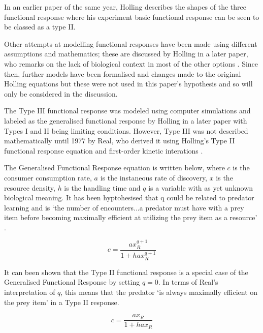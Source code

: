 \documentclass[11pt, a4paper, titlepage]{article}
\begin{document}
In an earlier paper of the same year, Holling describes the shapes of the three functional response \parencite{Holling1959a} where his experiment basic functional response can be seen to be classed as a type II.

Other attempts at modelling functional responses have been made using different assumptions and mathematics; these are discussed by Holling in a later paper, who remarks on the lack of biological context in most of the other options \parencite{Holling1965}. Since then, further models have been formalised and changes made to the original Holling equations but these were not used in this paper's hypothesis and so will only be considered in the discussion. 

\bigskip

The Type III functional response was modeled using computer simulations and labeled as the generalised functional response by Holling in a later paper \parencite{Holling1965} with Types I and II being limiting conditions. However, Type III was not described mathematically until 1977 by Real, who derived it using Holling's Type II functional response equation and first-order kinetic interations \parencite{Real1977}.
 
The Generalised Functional Response equation is written below, where $c$ is the consumer consumption rate, $a$ is the instaneous rate of discovery, $x$ is the resource density, $h$ is the handling time and $q$ is a variable with as yet unknown biological meaning. It has been hyptohesised that q could be related to predator learning and is `the number of encounters...a predator must have with a prey item before becoming maximally efficient at utilizing the prey item as a resource' \parencite{Real1977}.

\begin{equation}
c = \frac{ax_R^{q + 1}}{1 + hax_R^{q + 1}}
\end{equation}

\bigskip

It can been shown that the Type II functional response is a special case of the Generalised Functional Response by setting $q = 0$. In terms of Real's interpretation of $q$, this means that the predator `is always maximally efficient on the prey item'  \parencite{Real1977} in a Type II response.

\begin{equation}
c = \frac{ax_R}{1 + hax_R}
\end{equation}

\bigskip
\end{document}
